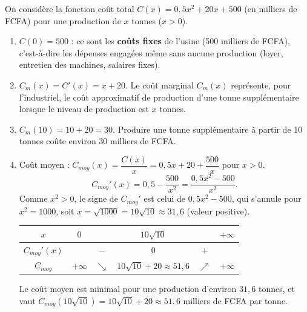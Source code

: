\documentclass[11pt]{article}
\begin{document}
\begin{corrige}
On considère la fonction coût total $C(x)=0{,}5x^2+20x+500$ (en milliers de FCFA) pour une production de $x$ tonnes ($x>0$).
\begin{enumerate}
    \item $C(0)=500$ : ce sont les \textbf{coûts fixes} de l'usine (500 milliers de FCFA), c'est-à-dire les dépenses engagées même sans aucune production (loyer, entretien des machines, salaires fixes).
    \item $C_m(x)=C'(x)=x+20$. Le coût marginal $C_m(x)$ représente, pour l'industriel, le coût approximatif de production d'une tonne supplémentaire lorsque le niveau de production est $x$ tonnes.
    \item $C_m(10)=10+20=30$. Produire une tonne supplémentaire à partir de 10 tonnes coûte environ 30 milliers de FCFA.
    \item Coût moyen : $C_{moy}(x)=\dfrac{C(x)}{x}=0{,}5x+20+\dfrac{500}{x}$ pour $x>0$.
    \[ C_{moy}'(x)=0{,}5-\frac{500}{x^2}=\frac{0{,}5x^2-500}{x^2}. \]
    Comme $x^2>0$, le signe de $C_{moy}'$ est celui de $0{,}5x^2-500$, qui s'annule pour $x^2=1000$, soit $x=\sqrt{1000}=10\sqrt{10}\approx 31{,}6$ (valeur positive).
    \begin{center}
    \begin{tabular}{|c|ccccc|}\hline
    $x$ & $0$ & & $10\sqrt{10}$ & & $+\infty$ \\ \hline
    $C_{moy}'(x)$ & & $-$ & $0$ & $+$ & \\ \hline
    $C_{moy}$ & $+\infty$ & $\searrow$ & $10\sqrt{10}+20\approx 51{,}6$ & $\nearrow$ & $+\infty$ \\ \hline
    \end{tabular}
    \end{center}
    Le coût moyen est minimal pour une production d'environ $31{,}6$ tonnes, et vaut $C_{moy}(10\sqrt{10})=10\sqrt{10}+20\approx 51{,}6$ milliers de FCFA par tonne.
\end{enumerate}
\end{corrige}
\end{document}
